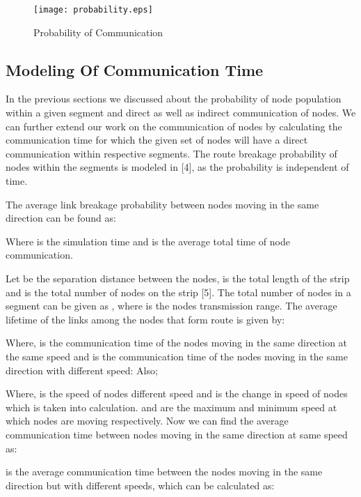\documentclass[journal]{IEEEtran}
\begin{document}
\begin{figure}[h]
\begin{center}
\texttt{[image: probability.eps]}
\caption{Probability of Communication}
\end{center}
\end{figure}
\vspace{-0.5cm}



\subsection{Modeling Of Communication Time}
In the previous sections we discussed about the probability of node population within a given segment and direct as well as indirect communication of nodes.
We can further extend our work on the communication of nodes by calculating the communication time for which the given set of nodes will have a direct communication within respective segments. The route breakage probability of nodes within the segments is modeled in [4], as the probability is independent of time.

The average link breakage probability between nodes moving in the same direction  can be found as:



Where  is the simulation time and  is the average total time of node communication.

Let  be the separation distance between the nodes,  is the total length of the strip and  is the total number of nodes on the strip [5]. The total number of nodes in a segment  can be given as , where  is the nodes transmission range. The average lifetime of the links among the nodes that form route is given by:



Where,  is the communication time of the nodes moving in the same direction at the same speed and  is the communication time of the nodes moving in the same direction with different speed: Also;


Where,  is the speed of nodes different speed and  is the change in speed of nodes which is taken into calculation.  and  are the maximum and minimum speed at which nodes are moving respectively. Now we can find the average communication time  between nodes moving in the same direction at same speed as:



 is the average communication time between the nodes moving in the same direction but with different speeds, which can be calculated as:
\end{document}
